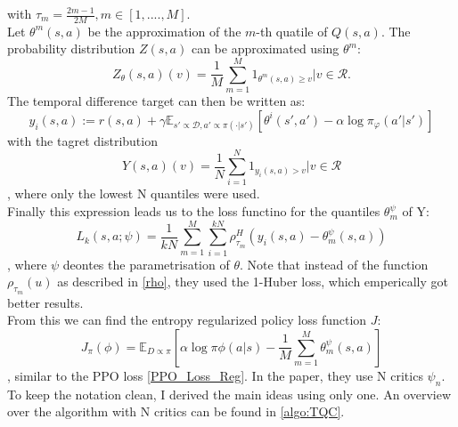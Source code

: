 with ${\tau_m = \frac{2m-1}{2M}}, m \in [1, ...., M]$.\\
Let $\theta^m(s,a)$ be the approximation of the $m$-th quatile of $Q(s,a)$. The probability distribution $Z(s,a)$ can be approximated using $\theta^m$:
\begin{equation}
    Z_{\theta}(s,a) (v) = \frac{1}{M} \sum_{m=1}^M 1_{\theta^m(s,a) \geq v} | v\in\mathcal{R}.
\end{equation}
The temporal difference target can then be written as:
\begin{equation}
    y_i(s,a) := r(s,a) + \gamma \mathbb{E}_{s' \propto \mathcal{D}, a' \propto \pi(\cdot|s')}[\theta^i(s',a') - \alpha \log \pi_{\varphi}(a'|s')]
\end{equation}
with the tagret distribution
\begin{equation}
    Y(s,a)(v) = \frac{1}{N} \sum_{i=1}^N 1_{y_i(s,a) > v} | v \in \mathcal{R}
\end{equation}
, where only the lowest N quantiles were used. \\
Finally this expression leads us to the loss functino for the quantiles $\theta_m^{\psi}$ of Y:
\begin{equation}
    L_k(s,a;\psi) = \frac{1}{kN}\sum_{m=1}^{M}\sum_{i=1}^{kN}\rho^H_{\tau_m} \left(y_i(s,a) - \theta_m^{\psi}(s,a)\right)
\end{equation}
, where $\psi$ deontes the parametrisation of $\theta$. Note that instead of the function $\rho_{\tau_m}(u)$ as described in \ref{rho}, they used the 
1-Huber loss, which emperically got better results. \\
From this we can find the entropy regularized policy loss function $J$:
\begin{equation}
    J_\pi(\phi) = \mathbb{E}_{D \propto \pi}\left[\alpha\log\pi{\phi}(a|s) - \frac{1}{M}\sum_{m=1}^{M}\theta_m^{\psi}(s,a)\right]
\end{equation}
, similar to the PPO loss \ref{PPO_Loss_Reg}. In the paper, they use N critics $\psi_n$. To keep the notation clean, I derived the main ideas using only one. An 
overview over the algorithm with N critics can be found in \ref{algo:TQC}.

